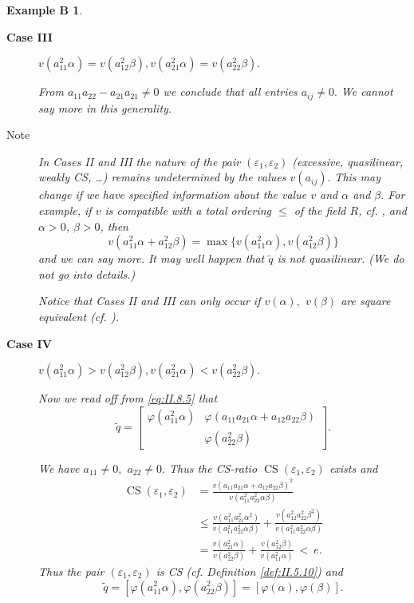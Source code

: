 \documentclass [12pt,a4paper,reqno]{amsart}
\newtheorem*{exampleB*}{Example B}
\begin{document}
\begin{exampleB*}
\begin{description}
{\vskip 1.5mm \noindent}

\item[\textbf{Case III}] $v(a_{11}^2{\alpha})=v(a_{12}^2{\beta}),$\qquad $v(a_{21}^2{\alpha}) = v(a_{22}^2{\beta}).$

From $a_{11}a_{22}-a_{21}a_{21}\ne0$ we conclude that all entries $a_{ij}\ne 0.$
We cannot say more in this generality.
{\vskip 1.5mm \noindent}

\item[Note]

In Cases II and III the nature of the pair $({\varepsilon}_1,{\varepsilon}_2)$ (excessive, quasilinear, weakly CS, \dots) remains undetermined by the values $v(a_{ij}).$ This may change  if we have specified information about the value $v$ and ${\alpha}$ and ${\beta}.$ For example, if $v$ is compatible with a total ordering $\leq$ of the field $R$, cf.  \cite{lam}, and ${\alpha} > 0 $, ${\beta} > 0$, then
$$ v(a_{11}^2{\alpha} + a_{12}^2 {\beta}) = \max \{   v(a_{11}^2{\alpha}) , v( a_{12}^2 {\beta})\} $$
 and we can say more. It may well happen that ${\tilde q}$ is not quasilinear. (We do not go into details.)

Notice that Cases II and III can only occur if $v({\alpha}),$ $v({\beta})$ are square equivalent (cf. {\cite[Definition~{{7.1}}]{QF1}}).

{\vskip 1.5mm \noindent}

\item[\textbf{Case IV}] $v(a_{11}^2{\alpha}) > v(a_{12}^2{\beta}),$\qquad $v(a_{21}^2{\alpha}) < v(a_{22}^2{\beta}).$

Now we read off from \eqref{eq:II.8.5} that
$${\tilde q}=\begin{bmatrix} {\varphi}(a_{11}^2{\alpha}) & {\varphi}(a_{11}a_{21}{\alpha}+a_{12}a_{22}{\beta})\\
 & {\varphi}(a_{22}^2{\beta})\end{bmatrix}.$$

We have $a_{11}\ne0,$ $a_{22}\ne0.$ Thus the CS-ratio ${\operatorname{CS}}({\varepsilon}_1,{\varepsilon}_2)$ exists and
\begin{align*}
{\operatorname{CS}}({\varepsilon}_1,{\varepsilon}_2)&=\frac{v(a_{11}a_{21}{\alpha}+a_{12}a_{22}{\beta})^2}{v(a_{11}^2a_{22}^2{\alpha}{\beta})}\\[1mm]
& \leq \frac{v(a_{11}^2a_{21}^2{\alpha}^2)}{v(a_{11}^2a_{22}^2{\alpha}{\beta})}+\frac{v(a_{12}^2a_{22}^2{\beta}^2)}{v(a_{11}^2a_{22}^2{\alpha}{\beta})}\\[1mm]
&=\frac{v(a_{21}^2{\alpha})}{v(a_{22}^2{\beta})}+\frac{v(a_{12}^2{\beta})}{v(a_{11}^2{\alpha})} {\ {<} \ }e.\end{align*}
Thus the pair $({\varepsilon}_1,{\varepsilon}_2)$ is CS (cf. Definition  \ref{def:II.5.10}) and
$${\tilde q}=[{\varphi}(a_{11}^2{\alpha}),{\varphi}(a_{22}^2{\beta})]=[{\varphi}({\alpha}),{\varphi}({\beta})].$$


\end{description}
\end{exampleB*}
\end{document}
